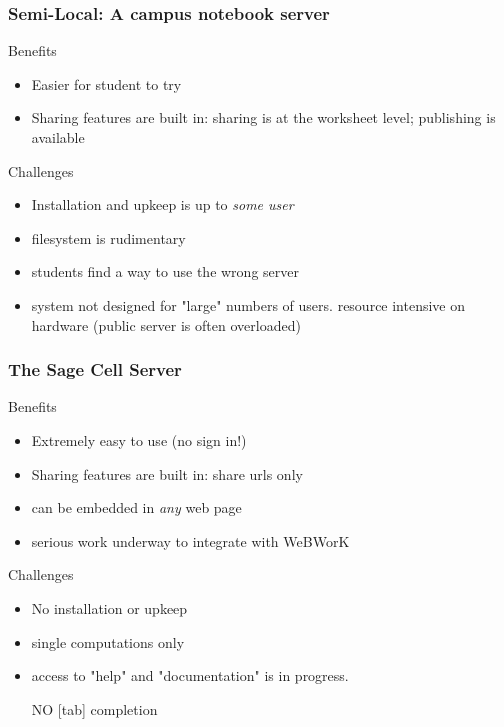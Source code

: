 \documentclass{beamer}
\begin{document}

\begin{frame}
\frametitle{Semi-Local: A campus notebook server}

\begin{block}{Benefits}
\begin{itemize}
\item Easier for student to try
\item Sharing features are built in: sharing is at the worksheet level; publishing is available
\end{itemize}
\end{block}

\begin{block}{Challenges}
\begin{itemize}
\item Installation and upkeep is up to \emph{some user}
\item filesystem is rudimentary
\item students find a way to use the wrong server
\item system not designed for "large" numbers of users. resource intensive on hardware (public server is often overloaded)
\end{itemize}
\end{block}

\end{frame}


\begin{frame}
\frametitle{The Sage Cell Server}

\begin{block}{Benefits}
\begin{itemize}
\item Extremely easy to use (no sign in!)
\item Sharing features are built in: share urls only
\item can be embedded in \emph{any} web page
\item serious work underway to integrate with WeBWorK
\end{itemize}
\end{block}

\begin{block}{Challenges}
\begin{itemize}
\item No installation or upkeep
\item single computations only
\item access to "help" and "documentation" is in progress.

NO [tab] completion
\end{itemize}
\end{block}

\end{frame}
\end{document}
